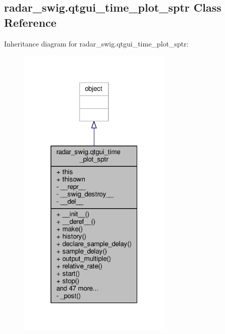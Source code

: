 \subsection{radar\+\_\+swig.\+qtgui\+\_\+time\+\_\+plot\+\_\+sptr Class Reference}
\label{classradar__swig_1_1qtgui__time__plot__sptr}


Inheritance diagram for radar\+\_\+swig.\+qtgui\+\_\+time\+\_\+plot\+\_\+sptr\+:
\nopagebreak
\begin{figure}[H]
\begin{center}
\leavevmode
\includegraphics[width=208pt]{dc/dca/classradar__swig_1_1qtgui__time__plot__sptr__inherit__graph}
\end{center}
\end{figure}


